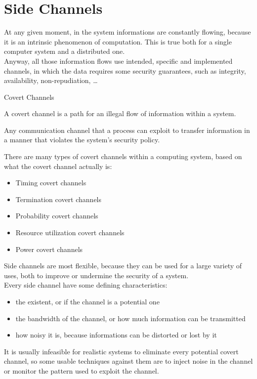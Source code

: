 \section{Side Channels}
At any given moment, in the system informations are constantly flowing, because
it is an intrinsic phenomenon of computation. This is true both for a single computer system and a
distributed one.\\
Anyway, all those information flows use intended, specific and implemented channels, in which the
data requires some security guarantees, such as integrity, availability, non-repudiation, \dots\\

\begin{section}{Covert Channels}
  \begin{boxH}
    A covert channel is a path for an illegal flow of information within a system.
  \end{boxH}
  Any communication channel that a process can exploit to transfer information in a manner that
  violates the system’s security policy.

  There are many types of covert channels within a computing system, based on what the covert channel
  actually is:
  \begin{itemize}
    \item Timing covert channels
    \item Termination covert channels
    \item Probability covert channels
    \item Resource utilization covert channels
    \item Power covert channels
  \end{itemize}

  Side channels are most flexible, because they can be used for a large variety of uses, both to
  improve or undermine the security of a system.\\
  Every side channel have some defining characteristics:
  \begin{itemize}
    \item the existent, or if the channel is a potential one
    \item the bandwidth of the channel, or how much information can be transmitted
    \item how noisy it is, because informations can be distorted or lost by it
  \end{itemize}
  It is usually infeasible for realistic systems to eliminate every potential covert
  channel, so some usable techniques against them are to inject noise in the channel or monitor the
  pattern used to exploit the channel.
\end{section}
